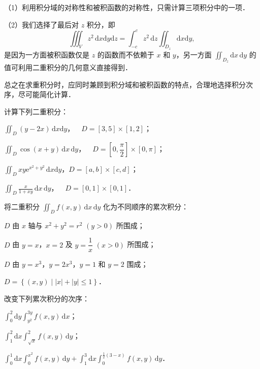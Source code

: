 （1）利用积分域的对称性和被积函数的对称性，只需计算三项积分中的一项．

（2）我们选择了最后对 $z$ 积分，即
\[
\iiint_{V}z^{2}\,\mathrm{d}x\mathrm{d}y\mathrm{d}z=\int_{-c}^{c}z^{2}\,\mathrm{d}z\iint_{D_{z}}\mathrm{d}x\mathrm{d}y,
\]
是因为一方面被积函数仅是 $z$ 的函数而不依赖于 $x$ 和 $y$，另一方面 $\displaystyle\iint_{D_{z}}\mathrm{d}x\,\mathrm{d}y$ 的值可利用二重积分的几何意义直接得到．

总之在求重积分时，应同时兼顾到积分域和被积函数的特点，合理地选择积分次序，尽可能简化计算．

\begin{xiti}
\item 计算下列二重积分：
\begin{ziti}
\item $\displaystyle\iint_{D}(y-2x)\,\mathrm{d}x\mathrm{d}y$，$\quad D=[3,5]\times[1,2]$；
\item $\displaystyle\iint_{D}\cos(x+y)\,\mathrm{d}x\,\mathrm{d}y$，$\quad D=\left[0,\dfrac{\pi}{2}\right]\times[0,\pi]$；
\item $\displaystyle\iint_{D}xy\mathrm{e}^{x^{2}+y^{2}}\,\mathrm{d}x\mathrm{d}y$，$D=[a,b]\times[c,d]$；
\item $\displaystyle\iint_{D}\frac{x}{1+xy}\,\mathrm{d}x\,\mathrm{d}y$，$\quad D=[0,1]\times[0,1]$．
\end{ziti}
\item 将二重积分 $\displaystyle\iint_{D}f(x,y)\,\mathrm{d}x\,\mathrm{d}y$ 化为不同顺序的累次积分：
\begin{ziti}
\item $D$ 由 $x$ 轴与 $x^{2}+y^{2}=r^{2}$ $(y>0)$ 所围成；
\item $D$ 由 $y=x$，$x=2$ 及 $y=\dfrac{1}{x}$ $(x>0)$ 所围成；
\item $D$ 由 $y=x^{3}$，$y=2x^{3}$，$y=1$ 和 $y=2$ 围成；
\item $D=\left\{(x,y)\mid \left|x\right|+\left|y\right|\leqslant 1\right\}$．
\end{ziti}
\item 改变下列累次积分的次序：
\begin{ziti}
\item $\displaystyle\int_{0}^{2}\mathrm{d}y\int_{y^{2}}^{3y}f(x,y)\,\mathrm{d}x$；
\item $\displaystyle\int_{1}^{2}\mathrm{d}x\int_{\sqrt{x}}^{2}f(x,y)\,\mathrm{d}y$；
\item $\displaystyle\int_{0}^{1}\mathrm{d}x\int_{0}^{x^{2}}f(x,y)\,\mathrm{d}y+\int_{1}^{3}\mathrm{d}x\int_{0}^{\frac{1}{2}(3-x)}f(x,y)\,\mathrm{d}y$．

\end{ziti}
\end{xiti}
